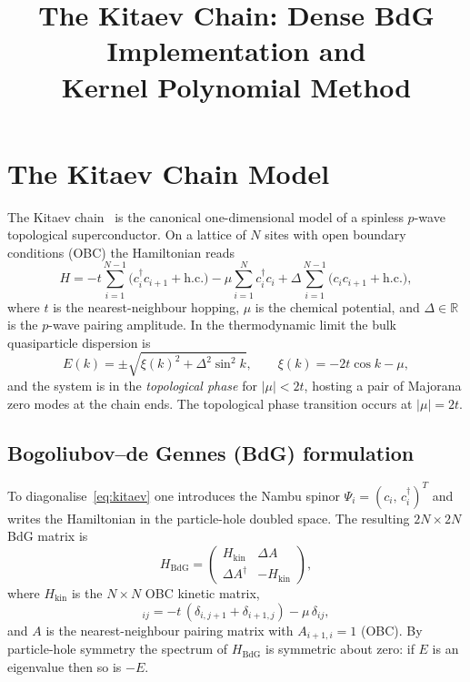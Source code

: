 \documentclass[11pt,a4paper]{article}
\title{The Kitaev Chain: Dense BdG Implementation and\\
       Kernel Polynomial Method}
\author{}
\date{}
\begin{document}
\maketitle
\tableofcontents
\bigskip

\section{The Kitaev Chain Model}
\label{sec:model}

The Kitaev chain~\cite{Kitaev2001} is the canonical one-dimensional model of a
spinless $p$-wave topological superconductor.  On a lattice of $N$ sites with
open boundary conditions (OBC) the Hamiltonian reads
\begin{equation}
  H = -t\sum_{i=1}^{N-1}\!\bigl(c_i^\dagger c_{i+1} + \mathrm{h.c.}\bigr)
      - \mu\sum_{i=1}^{N} c_i^\dagger c_i
      + \Delta\sum_{i=1}^{N-1}\!\bigl(c_i c_{i+1} + \mathrm{h.c.}\bigr),
  \label{eq:kitaev}
\end{equation}
where $t$ is the nearest-neighbour hopping, $\mu$ is the chemical potential,
and $\Delta \in \mathbb{R}$ is the $p$-wave pairing amplitude.
In the thermodynamic limit the bulk quasiparticle dispersion is
\begin{equation}
  E(k) = \pm\sqrt{\xi(k)^2 + \Delta^2\sin^2 k},
  \qquad \xi(k) = -2t\cos k - \mu,
\end{equation}
and the system is in the \emph{topological phase} for $|\mu| < 2t$, hosting a
pair of Majorana zero modes at the chain ends.  The topological phase
transition occurs at $|\mu| = 2t$.

\subsection{Bogoliubov–de Gennes (BdG) formulation}

To diagonalise~\eqref{eq:kitaev} one introduces the Nambu spinor
$\Psi_i = (c_i,\, c_i^\dagger)^T$ and writes the Hamiltonian in the
particle-hole doubled space.  The resulting $2N\times 2N$ BdG matrix is
\begin{equation}
  H_{\mathrm{BdG}} =
  \begin{pmatrix} H_{\mathrm{kin}} & \Delta A \\ \Delta A^\dagger & -H_{\mathrm{kin}} \end{pmatrix},
  \label{eq:BdG}
\end{equation}
where $H_{\mathrm{kin}}$ is the $N\times N$ OBC kinetic matrix,
\begin{equation}
  [H_{\mathrm{kin}}]_{ij} = -t\,(\delta_{i,j+1}+\delta_{i+1,j}) - \mu\,\delta_{ij},
\end{equation}
and $A$ is the nearest-neighbour pairing matrix with $A_{i+1,i}=1$ (OBC).
By particle-hole symmetry the spectrum of $H_{\mathrm{BdG}}$ is symmetric
about zero: if $E$ is an eigenvalue then so is $-E$.
\end{document}
